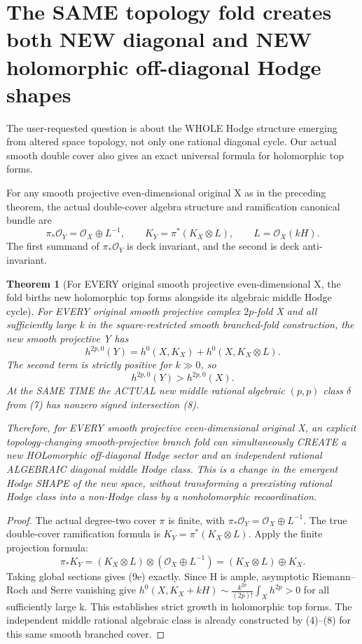 \documentclass[11pt]{article}
\newcommand{\OO}{\mathcal O}
\newtheorem{theorem}{Theorem}
\begin{document}
\section{The SAME topology fold creates both NEW diagonal and NEW holomorphic off-diagonal Hodge shapes}
The user-requested
question is
about the
WHOLE Hodge
structure
emerging from
altered
space topology,
not only
one rational
diagonal
cycle.
Our actual
smooth
double cover
also gives
an exact
universal
formula for
holomorphic
top forms.

For any
smooth
projective
even-dimensional
original X
as in
the preceding
theorem,
the actual
double-cover
algebra structure
and ramification
canonical bundle
are
\[
 \pi_*\OO_Y
      =\OO_X\oplus L^{-1},
 \qquad
 K_Y=\pi^*(K_X\otimes L),
 \qquad
 L=\OO_X(kH).
                                                               \tag{9d}
\]
The first
summand of
\(\pi_*\OO_Y\)
is deck
invariant,
and the
second
is
deck
anti-invariant.

\begin{theorem}[For EVERY original smooth projective even-dimensional X, the fold births new holomorphic top forms alongside its algebraic middle Hodge cycle]
For EVERY
original
smooth
projective
complex
\(2p\)-fold X
and all
sufficiently
large k
in the
square-restricted
smooth
branched-fold
construction,
the new
smooth
projective
Y has
\[
 \boxed{
 h^{2p,0}(Y)
   =h^0(X,K_X)
      +h^0(X,K_X\otimes L).
 }                                                        \tag{9e}
\]
The second
term is
strictly
positive
for
\(k\gg0\),
so
\[
 \boxed{
    h^{2p,0}(Y)>h^{2p,0}(X).
 }                                                        \tag{9f}
\]
At the
SAME TIME
the
ACTUAL
new
middle
rational
algebraic
\((p,p)\)
class
\(\delta\)
from (7)
has
nonzero
signed
intersection
(8).

Therefore,
for EVERY
smooth
projective
even-dimensional
original X,
an explicit
topology-changing
smooth-projective
branch fold
can simultaneously
CREATE
a new
HOLomorphic
off-diagonal
Hodge
sector
and
an
independent
rational
ALGEBRAIC
diagonal
middle
Hodge
class.
This is
a change
in the
emergent
Hodge
SHAPE of
the
new
space,
without
transforming
a preexisting
rational
Hodge
class into
a non-Hodge
class
by a
nonholomorphic
recoordination.
\end{theorem}
\begin{proof}
The
actual
degree-two
cover
\(\pi\)
is finite,
with
\(\pi_*\OO_Y
=\OO_X\oplus L^{-1}\).
The true
double-cover
ramification
formula
is
\(K_Y=\pi^*(K_X\otimes L)\).
Apply
the
finite
projection
formula:
\[
 \pi_*K_Y
  =(K_X\otimes L)\otimes
           (\OO_X\oplus L^{-1})
  =(K_X\otimes L)\oplus K_X.
\]
Taking
global
sections
gives (9e)
exactly.
Since
H is
ample,
asymptotic
Riemann--Roch
and
Serre
vanishing
give
\(h^0(X,K_X+kH)
\sim\frac{k^{2p}}{(2p)!}\int_Xh^{2p}>0\)
for all
sufficiently
large k.
This
establishes
strict
growth
in
holomorphic
top
forms.
The
independent
middle
rational
algebraic
class
is
already
constructed
by
(4)--(8)
for this
same
smooth
branched
cover.
\end{proof}
\end{document}
